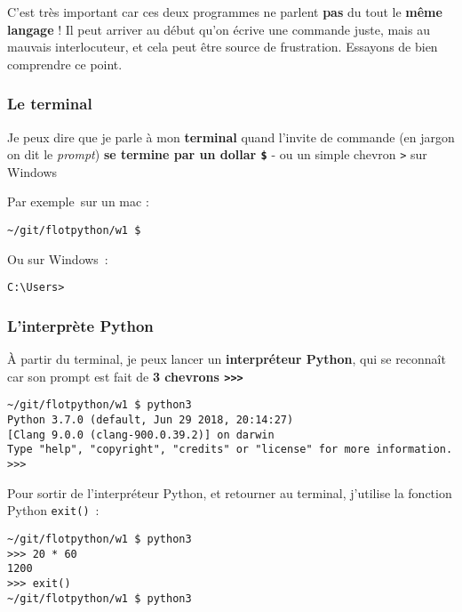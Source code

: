 C'est très important car ces deux programmes ne parlent \textbf{pas} du
tout le \textbf{même langage} ! Il peut arriver au début qu'on écrive
une commande juste, mais au mauvais interlocuteur, et cela peut être
source de frustration. Essayons de bien comprendre ce point.

    \hypertarget{le-terminal}{%
\subsubsection{Le terminal}\label{le-terminal}}

Je peux dire que je parle à mon \textbf{terminal} quand l'invite de
commande (en jargon on dit le \emph{prompt}) \textbf{se termine par un
dollar \texttt{\$}} - ou un simple chevron \texttt{\textgreater{}} sur
Windows

Par exemple~sur un mac :

\begin{verbatim}
~/git/flotpython/w1 $ 
\end{verbatim}

Ou sur Windows~:

\begin{verbatim}
C:\Users>        
\end{verbatim}

    \hypertarget{linterpruxe8te-python}{%
\subsubsection{L'interprète Python}\label{linterpruxe8te-python}}

À partir du terminal, je peux lancer un \textbf{interpréteur Python},
qui se reconnaît car son prompt est fait de \textbf{3 chevrons
\texttt{\textgreater{}\textgreater{}\textgreater{}}}

\begin{verbatim}
~/git/flotpython/w1 $ python3
Python 3.7.0 (default, Jun 29 2018, 20:14:27)
[Clang 9.0.0 (clang-900.0.39.2)] on darwin
Type "help", "copyright", "credits" or "license" for more information.
>>>
\end{verbatim}

    Pour sortir de l'interpréteur Python, et retourner au terminal,
j'utilise la fonction Python \texttt{exit()}~:

\begin{verbatim}
~/git/flotpython/w1 $ python3
>>> 20 * 60
1200
>>> exit()
~/git/flotpython/w1 $ python3
\end{verbatim}

